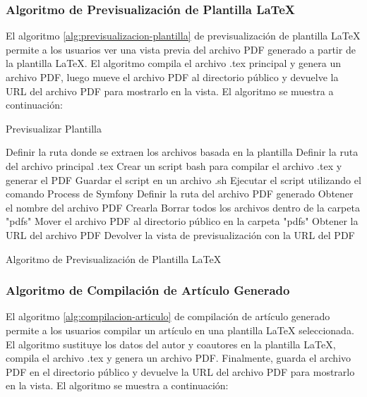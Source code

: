 \subsubsection{Algoritmo de Previsualización de Plantilla LaTeX}
El algoritmo \ref{alg:previsualizacion-plantilla} de previsualización de plantilla LaTeX permite a los usuarios ver una vista previa del archivo PDF generado a partir de la plantilla LaTeX. El algoritmo compila el archivo .tex principal y genera un archivo PDF, luego mueve el archivo PDF al directorio público y devuelve la URL del archivo PDF para mostrarlo en la vista. El algoritmo se muestra a continuación:

\begin{algorithm}
    \caption{Previsualizar Plantilla}
    \begin{algorithmic}[1]
        \State Definir la ruta donde se extraen los archivos basada en la plantilla
        \State Definir la ruta del archivo principal .tex
        \State Crear un script bash para compilar el archivo .tex y generar el PDF
        \State Guardar el script en un archivo .sh
        \State Ejecutar el script utilizando el comando Process de Symfony
        \State Definir la ruta del archivo PDF generado
        \State Obtener el nombre del archivo PDF
            \State Crearla
        \Else
            \State Borrar todos los archivos dentro de la carpeta "pdfs"
        \EndIf
        \State Mover el archivo PDF al directorio público en la carpeta "pdfs"
        \State Obtener la URL del archivo PDF
        \State Devolver la vista de previsualización con la URL del PDF
    \EndProcedure
    \end{algorithmic}
    \caption{Algoritmo de Previsualización de Plantilla LaTeX}
    \label{alg:previsualizacion-plantilla}
\end{algorithm}

\subsubsection{Algoritmo de Compilación de Artículo Generado}

El algoritmo \ref{alg:compilacion-articulo} de compilación de artículo generado permite a los usuarios compilar un artículo en una plantilla LaTeX seleccionada. El algoritmo sustituye los datos del autor y coautores en la plantilla LaTeX, compila el archivo .tex y genera un archivo PDF. Finalmente, guarda el archivo PDF en el directorio público y devuelve la URL del archivo PDF para mostrarlo en la vista. El algoritmo se muestra a continuación:

